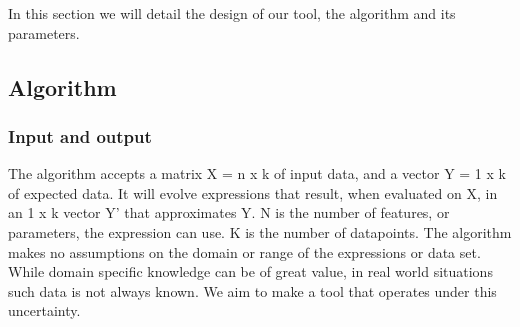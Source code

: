 In this section we will detail the design of our tool, the algorithm and its parameters. 
\subsection{Algorithm}
\subsubsection{Input and output}
The algorithm accepts a matrix X = n x k of input data, and a vector Y = 1 x k of expected data. It will evolve expressions that result, when evaluated on X, in an 1 x k vector Y' that approximates Y. N is the number of features, or parameters, the expression can use. K is the number of datapoints. The algorithm makes no assumptions on the domain or range of the expressions or data set. While domain specific knowledge can be of great value, in real world situations such data is not always known. We aim to make a tool that operates under this uncertainty.
